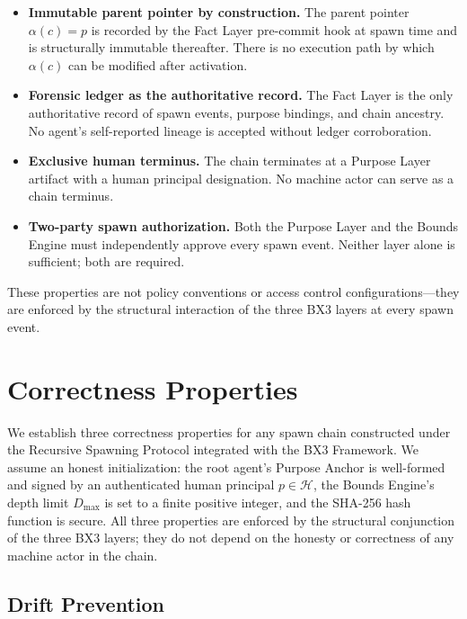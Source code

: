 \begin{itemize}
  \item \textbf{Immutable parent pointer by construction.} The parent pointer $\alpha(c) = p$ is recorded by the Fact Layer pre-commit hook at spawn time and is structurally immutable thereafter. There is no execution path by which $\alpha(c)$ can be modified after activation.
  \item \textbf{Forensic ledger as the authoritative record.} The Fact Layer is the only authoritative record of spawn events, purpose bindings, and chain ancestry. No agent's self-reported lineage is accepted without ledger corroboration.
  \item \textbf{Exclusive human terminus.} The chain terminates at a Purpose Layer artifact with a human principal designation. No machine actor can serve as a chain terminus.
  \item \textbf{Two-party spawn authorization.} Both the Purpose Layer and the Bounds Engine must independently approve every spawn event. Neither layer alone is sufficient; both are required.
\end{itemize}

These properties are not policy conventions or access control configurations---they are enforced by the structural interaction of the three BX3 layers at every spawn event.

\section{Correctness Properties}
\label{sec:correctness-properties}

We establish three correctness properties for any spawn chain constructed under the Recursive Spawning Protocol integrated with the BX3 Framework. We assume an honest initialization: the root agent's Purpose Anchor is well-formed and signed by an authenticated human principal $p \in \mathcal{H}$, the Bounds Engine's depth limit $D_{\max}$ is set to a finite positive integer, and the SHA-256 hash function is secure. All three properties are enforced by the structural conjunction of the three BX3 layers; they do not depend on the honesty or correctness of any machine actor in the chain.

\subsection{Drift Prevention}

